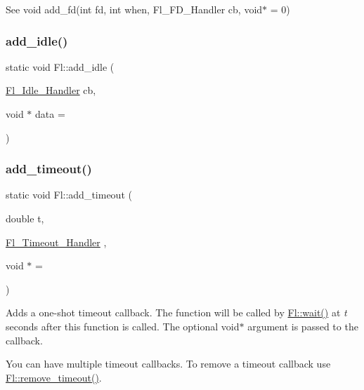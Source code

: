 See void add\+\_\+fd(int fd, int when, Fl\+\_\+\+F\+D\+\_\+\+Handler cb, void$\ast$ = 0) \mbox{\label{class_fl_a42d6e5121c18ed1a422fbb02993cf900}} 
\subsubsection{\texorpdfstring{add\+\_\+idle()}{add\_idle()}}
{\footnotesize\ttfamily static void Fl\+::add\+\_\+idle (\begin{DoxyParamCaption}\item[{\hyperlink{group__callback__functions_gac9d2aab1d3142308450e2da09716013e}{Fl\+\_\+\+Idle\+\_\+\+Handler}}]{cb,  }\item[{void $\ast$}]{data = {} }\end{DoxyParamCaption})\hspace{0.3cm}{\ttfamily [static]}}

\mbox{\label{class_fl_a6a7f66c2bb04c04cb5252c0466f87022}} 
\subsubsection{\texorpdfstring{add\+\_\+timeout()}{add\_timeout()}}
{\footnotesize\ttfamily static void Fl\+::add\+\_\+timeout (\begin{DoxyParamCaption}\item[{double}]{t,  }\item[{\hyperlink{group__callback__functions_ga17b5c6570394124287997166a50ff07a}{Fl\+\_\+\+Timeout\+\_\+\+Handler}}]{,  }\item[{void $\ast$}]{ = {} }\end{DoxyParamCaption})\hspace{0.3cm}{\ttfamily [static]}}

Adds a one-\/shot timeout callback. The function will be called by \hyperlink{class_fl_a60da08d5496f625769828d4b71614ab0}{Fl\+::wait()} at {\itshape t} seconds after this function is called. The optional void$\ast$ argument is passed to the callback.

You can have multiple timeout callbacks. To remove a timeout callback use \hyperlink{class_fl_ad22be36baba9f4f3396aeed4c91fb257}{Fl\+::remove\+\_\+timeout()}.

